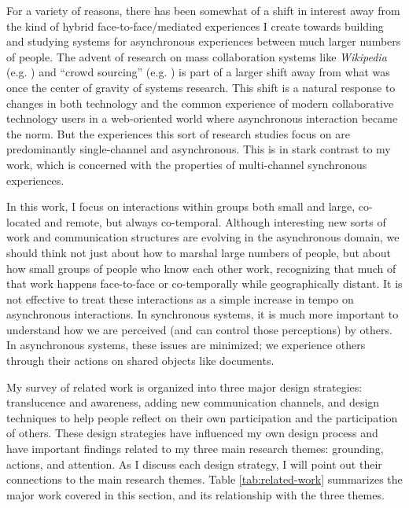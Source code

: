 For a variety of reasons, there has been somewhat of a shift in interest away from the kind of hybrid face-to-face/mediated experiences I create towards building and studying systems for asynchronous experiences between much larger numbers of people. The advent of research on mass collaboration systems like \emph{Wikipedia} (e.g. \citep{Kittur:2007up}) and ``crowd sourcing'' (e.g. \citep{Bernstein:2010wk}) is part of a larger shift away from what was once the center of gravity of systems research. This shift is a natural response to changes in both technology and the common experience of modern collaborative technology users in a web-oriented world where asynchronous interaction became the norm. But the experiences this sort of research studies focus on are predominantly single-channel and asynchronous. This is in stark contrast to my work, which is concerned with the properties of multi-channel synchronous experiences. 

In this work, I focus on interactions within groups both small and large, co-located and remote, but always co-temporal. Although interesting new sorts of work and communication structures are evolving in the asynchronous domain, we should think not just about how to marshal large numbers of people, but about how small groups of people who know each other work, recognizing that much of that work happens face-to-face or co-temporally while geographically distant. It is not effective to treat these interactions as a simple increase in tempo on asynchronous interactions. In synchronous systems, it is much more important to understand how we are perceived (and can control those perceptions) by others. In asynchronous systems, these issues are minimized; we experience others through their actions on shared objects like documents. 


My survey of related work is organized into three major design strategies: translucence and awareness, adding new communication channels, and design techniques to help people reflect on their own participation and the participation of others. These design strategies have influenced my own design process and have important findings related to my three main research themes: grounding, actions, and attention. As I discuss each design strategy, I will point out their connections to the main research themes. Table \ref{tab:related-work} summarizes the major work covered in this section, and its relationship with the three themes. 


